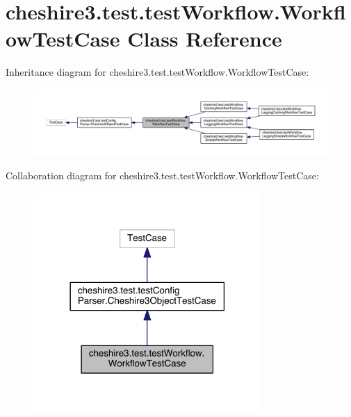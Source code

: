 \hypertarget{classcheshire3_1_1test_1_1test_workflow_1_1_workflow_test_case}{\section{cheshire3.\-test.\-test\-Workflow.\-Workflow\-Test\-Case Class Reference}
\label{classcheshire3_1_1test_1_1test_workflow_1_1_workflow_test_case}
}


Inheritance diagram for cheshire3.\-test.\-test\-Workflow.\-Workflow\-Test\-Case\-:
\nopagebreak
\begin{figure}[H]
\begin{center}
\leavevmode
\includegraphics[width=350pt]{classcheshire3_1_1test_1_1test_workflow_1_1_workflow_test_case__inherit__graph}
\end{center}
\end{figure}


Collaboration diagram for cheshire3.\-test.\-test\-Workflow.\-Workflow\-Test\-Case\-:
\nopagebreak
\begin{figure}[H]
\begin{center}
\leavevmode
\includegraphics[width=246pt]{classcheshire3_1_1test_1_1test_workflow_1_1_workflow_test_case__coll__graph}
\end{center}
\end{figure}
